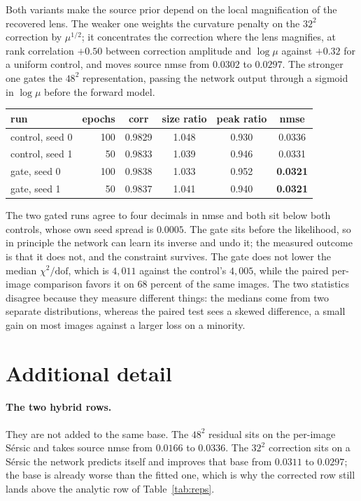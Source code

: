 \documentclass{article}
\begin{document}
Both variants make the source prior depend on the local magnification of the
recovered lens. The weaker one weights the curvature penalty on the $32^{2}$
correction by $\mu^{1/2}$; it concentrates the correction where the lens
magnifies, at rank correlation $+0.50$ between correction amplitude and
$\log \mu$ against $+0.32$ for a uniform control, and moves source nmse from
$0.0302$ to $0.0297$. The stronger one gates the $48^{2}$ representation, passing
the network output through a sigmoid in $\log \mu$ before the forward model.

\begin{table}[h]
  \centering
  \small
  \begin{tabular}{lrcccc}
    \toprule
    run & epochs & corr & size ratio & peak ratio & nmse \\
    \midrule
    control, seed 0 & 100 & 0.9829 & 1.048 & 0.930 & 0.0336 \\
    control, seed 1 & 50 & 0.9833 & 1.039 & 0.946 & 0.0331 \\
    gate, seed 0 & 100 & 0.9838 & 1.033 & 0.952 & \textbf{0.0321} \\
    gate, seed 1 & 50 & 0.9837 & 1.041 & 0.940 & \textbf{0.0321} \\
    \bottomrule
  \end{tabular}
\end{table}

The two gated runs agree to four decimals in nmse and both sit below both
controls, whose own seed spread is $0.0005$. The gate sits before the likelihood,
so in principle the network can learn its inverse and undo it; the measured
outcome is that it does not, and the constraint survives. The gate does not lower
the median $\chi^{2}/\mathrm{dof}$, which is $4{,}011$ against the control's
$4{,}005$, while the paired per-image comparison favors it on 68 percent of the
same images. The two statistics disagree because they measure different things:
the medians come from two separate distributions, whereas the paired test sees a
skewed difference, a small gain on most images against a larger loss on a
minority.

\section{Additional detail}
\label{app:extra}

\paragraph{The two hybrid rows.} They are not added to the same base. The
$48^{2}$ residual sits on the per-image S\'ersic and takes source nmse from
$0.0166$ to $0.0336$. The $32^{2}$ correction sits on a S\'ersic the network
predicts itself and improves that base from $0.0311$ to $0.0297$; the base is
already worse than the fitted one, which is why the corrected row still lands
above the analytic row of Table~\ref{tab:reps}.
\end{document}
